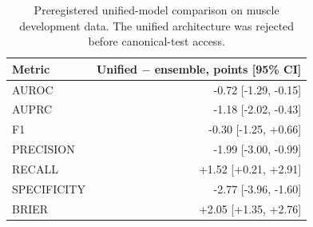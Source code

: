 \begin{table}[p]
\centering
\caption{Preregistered unified-model comparison on muscle development data. The unified architecture was rejected before canonical-test access.}\label{tab:unified}
\vspace{6pt}

\begin{tabular}{lr}
\toprule
Metric & Unified $-$ ensemble, points [95\% CI] \\
\midrule
AUROC & -0.72 [-1.29, -0.15] \\
AUPRC & -1.18 [-2.02, -0.43] \\
F1 & -0.30 [-1.25, +0.66] \\
PRECISION & -1.99 [-3.00, -0.99] \\
RECALL & +1.52 [+0.21, +2.91] \\
SPECIFICITY & -2.77 [-3.96, -1.60] \\
BRIER & +2.05 [+1.35, +2.76] \\
\bottomrule
\end{tabular}
\end{table}
